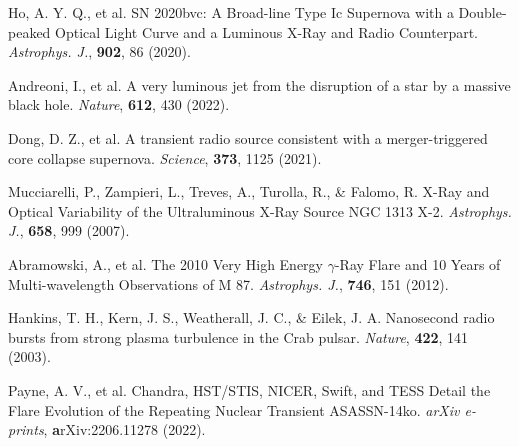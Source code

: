 \documentclass{nature_plusfigure}
\newcommand{\apj}{{Astrophys. J.}}
\newcommand{\nat}{{Nature}}
\newcommand{\araa}{Annual Review of Astronomy and Astrophysics}
\newcommand{\at}{AT2022tsd}
\begin{document}
\begin{thebibliography}{100}
 Ho, A. Y. Q., et al. SN 2020bvc: A Broad-line Type Ic Supernova with a Double-peaked Optical Light Curve and a Luminous X-Ray and Radio Counterpart. \emph{\apj}, \textbf{902}, 86 (2020). 

 Andreoni, I., et al. A very luminous jet from the disruption of a star by a massive black hole. \emph{\nat}, \textbf{612}, 430 (2022). 

 
   Dong, D. Z., et al. A transient radio source consistent with a merger-triggered core collapse supernova. \emph{Science}, \textbf{373}, 1125 (2021). 
  
 
 Mucciarelli, P., Zampieri, L., Treves, A., Turolla, R., \& Falomo, R. X-Ray and Optical Variability of the Ultraluminous X-Ray Source NGC 1313 X-2. \emph{\apj}, \textbf{658}, 999 (2007). 

 Abramowski, A., et al. The 2010 Very High Energy $\gamma$-Ray Flare and 10 Years of Multi-wavelength Observations of M 87. \emph{\apj}, \textbf{746}, 151 (2012). 

 Hankins, T. H., Kern, J. S., Weatherall, J. C., \& Eilek, J. A. Nanosecond radio bursts from strong plasma turbulence in the Crab pulsar. \emph{\nat}, \textbf{422}, 141 (2003). 

 Payne, A. V., et al. Chandra, HST/STIS, NICER, Swift, and TESS Detail the Flare Evolution of the Repeating Nuclear Transient ASASSN-14ko. \emph{arXiv e-prints}, \textbf arXiv:2206.11278 (2022). 




%
%
%


\end{thebibliography}


\end{document}
